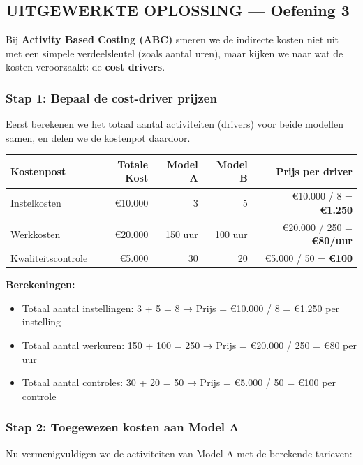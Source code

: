 \documentclass[a4paper,11pt]{article}
\begin{document}
\begin{oefenblok}
\subsection*{UITGEWERKTE OPLOSSING — Oefening 3}

Bij \textbf{Activity Based Costing (ABC)} smeren we de 
indirecte kosten niet uit met een simpele verdeelsleutel (zoals aantal uren), maar kijken we naar wat de kosten veroorzaakt: de \textbf{cost drivers}.

\subsubsection*{Stap 1: Bepaal de cost-driver prijzen}

Eerst berekenen we het totaal aantal activiteiten (drivers) voor beide modellen samen, en delen we de kostenpot daardoor.

\begin{center}
\begin{tabular}{|l|r|r|r|r|}
\hline
\textbf{Kostenpost} & \textbf{Totale Kost} & \textbf{Model A} & \textbf{Model B} & \textbf{Prijs per driver} \\
\hline
Instelkosten & €10.000 & 3 & 5 & €10.000 / 8 = \textbf{€1.250} \\
\hline
Werkkosten & €20.000 & 150 uur & 100 uur & €20.000 / 250 = \textbf{€80/uur} \\
\hline
Kwaliteitscontrole & €5.000 & 30 & 20 & €5.000 / 50 = \textbf{€100} \\
\hline
\end{tabular}
\end{center}

\textbf{Berekeningen:}
\begin{itemize}
    \item Totaal aantal instellingen: 3 + 5 = 8 → Prijs = €10.000 / 8 = €1.250 per instelling
    \item Totaal aantal werkuren: 150 + 100 = 250 → Prijs = €20.000 / 250 = €80 per uur
    \item Totaal aantal controles: 30 + 20 = 50 → Prijs = €5.000 / 50 = €100 per controle
\end{itemize}

\subsubsection*{Stap 2: Toegewezen kosten aan Model A}

Nu vermenigvuldigen we de activiteiten van Model A met de berekende tarieven:


\end{oefenblok}
\end{document}
